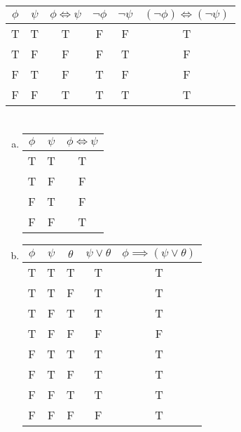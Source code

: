 \documentclass{article}
\begin{document}
\section{}

\begin{tabular}{ | c | c | c | c | c | c | }
  \hline
  $\phi$ & $\psi$ & $\phi \Leftrightarrow \psi $ &  $\neg\phi$ & $\neg\psi$ & $(\neg\phi) \Leftrightarrow (\neg\psi)$ \\
  \hline
  T & T & T & F & F & T \\
  T & F & F & F & T & F \\
  F & T & F & T & F & F \\
  F & F & T & T & T & T \\
  \hline
\end{tabular}

\section{}

\begin{enumerate}[(a)]
\item
  \begin{tabular}{ | c | c | c | }
    \hline
    $\phi$ & $\psi$ & $\phi \Leftrightarrow \psi $ \\
    \hline
    T & T & T \\
    T & F & F \\
    F & T & F \\
    F & F & T \\
    \hline
  \end{tabular}

\item
  \begin{tabular}{ | c | c | c | c | c | }
    \hline
    $\phi$ & $\psi$ & $\theta$ & $\psi \vee \theta$ & $\phi \implies (\psi \vee \theta)$ \\
    \hline
    T & T & T & T & T \\
    T & T & F & T & T \\
    T & F & T & T & T \\
    T & F & F & F & F \\
    F & T & T & T & T \\
    F & T & F & T & T \\
    F & F & T & T & T \\
    F & F & F & F & T \\
    \hline
  \end{tabular}
\end{enumerate}
\end{document}
